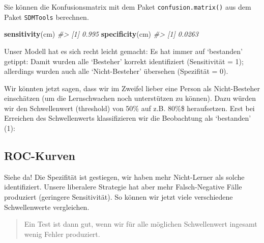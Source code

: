 \documentclass[12pt,ngerman,]{book}
\makeatletter
\newenvironment{Shaded}{\begin{snugshade}}{\end{snugshade}}
\newcommand{\KeywordTok}[1]{\textcolor[rgb]{0.13,0.29,0.53}{\textbf{#1}}}
\newcommand{\DataTypeTok}[1]{\textcolor[rgb]{0.13,0.29,0.53}{#1}}
\newcommand{\DecValTok}[1]{\textcolor[rgb]{0.00,0.00,0.81}{#1}}
\newcommand{\StringTok}[1]{\textcolor[rgb]{0.31,0.60,0.02}{#1}}
\newcommand{\CommentTok}[1]{\textcolor[rgb]{0.56,0.35,0.01}{\textit{#1}}}
\newcommand{\OperatorTok}[1]{\textcolor[rgb]{0.81,0.36,0.00}{\textbf{#1}}}
\newcommand{\NormalTok}[1]{#1}
\newenvironment{kframe}{%
\medskip{}
\setlength{\fboxsep}{.8em}
 \def\at@end@of@kframe{}%
 \ifinner\ifhmode%
  \def\at@end@of@kframe{\end{minipage}}%
  \begin{minipage}{\columnwidth}%
 \fi\fi%
 \def\FrameCommand##1{\hskip\@totalleftmargin \hskip-\fboxsep
 \colorbox{shadecolor}{##1}\hskip-\fboxsep
     \hskip-\linewidth \hskip-\@totalleftmargin \hskip\columnwidth}%
 \MakeFramed {\advance\hsize-\width
   \@totalleftmargin\z@ \linewidth\hsize
   \@setminipage}}%
 {\par\unskip\endMakeFramed%
 \at@end@of@kframe}
\renewenvironment{Shaded}{\begin{kframe}}{\end{kframe}}
\theoremstyle{definition}
\theoremstyle{definition}
\theoremstyle{remark}
\makeatother
\begin{document}
Sie können die Konfusionsmatrix mit dem Paket
\texttt{confusion.matrix()} aus dem Paket \texttt{SDMTools} berechnen.

\begin{Shaded}
\begin{Highlighting}[]
\KeywordTok{sensitivity}\NormalTok{(cm)}
\CommentTok{#> [1] 0.995}
\KeywordTok{specificity}\NormalTok{(cm)}
\CommentTok{#> [1] 0.0263}
\end{Highlighting}
\end{Shaded}

Unser Modell hat es sich recht leicht gemacht: Es hat immer auf
`bestanden' getippt: Damit wurden alle `Besteher' korrekt identifiziert
(Sensitivität = 1); allerdings wurden auch alle `Nicht-Besteher'
übersehen (Spezifität = 0).

Wir könnten jetzt sagen, dass wir im Zweifel lieber eine Person als
Nicht-Besteher einschätzen (um die Lernschwachen noch unterstützen zu
können). Dazu würden wir den Schwellenwert (threshold) von 50\% auf z.B.
80\%\$ heraufsetzen. Erst bei Erreichen des Schwellenwerts
klassifizieren wir die Beobachtung als `bestanden' (1):

\begin{Shaded}
\end{Shaded}

\subsection{ROC-Kurven}\label{roc-kurven}

Siehe da! Die Spezifität ist gestiegen, wir haben mehr Nicht-Lerner als
solche identifiziert. Unsere liberalere Strategie hat aber mehr
Falsch-Negative Fälle produziert (geringere Sensitivität). So können wir
jetzt viele verschiedene Schwellenwerte vergleichen.

\begin{quote}
Ein Test ist dann gut, wenn wir für alle möglichen Schwellenwert
ingesamt wenig Fehler produziert.
\end{quote}
\end{document}
